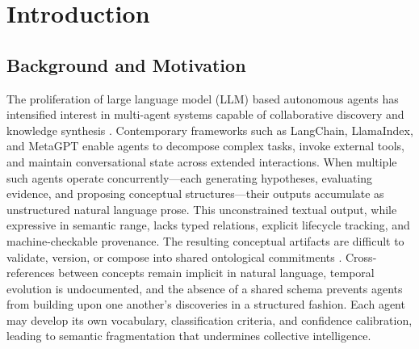 \section{Introduction}\label{introduction}

\subsection{Background and Motivation}\label{background-and-motivation}

The proliferation of large language model (LLM) based autonomous agents has intensified interest in multi-agent systems capable of collaborative discovery and knowledge synthesis \cite{ref1}\cite{ref2}. Contemporary frameworks such as LangChain, LlamaIndex, and MetaGPT enable agents to decompose complex tasks, invoke external tools, and maintain conversational state across extended interactions. When multiple such agents operate concurrently---each generating hypotheses, evaluating evidence, and proposing conceptual structures---their outputs accumulate as unstructured natural language prose. This unconstrained textual output, while expressive in semantic range, lacks typed relations, explicit lifecycle tracking, and machine-checkable provenance. The resulting conceptual artifacts are difficult to validate, version, or compose into shared ontological commitments \cite{ref3}\cite{ref4}. Cross-references between concepts remain implicit in natural language, temporal evolution is undocumented, and the absence of a shared schema prevents agents from building upon one another's discoveries in a structured fashion. Each agent may develop its own vocabulary, classification criteria, and confidence calibration, leading to semantic fragmentation that undermines collective intelligence.

